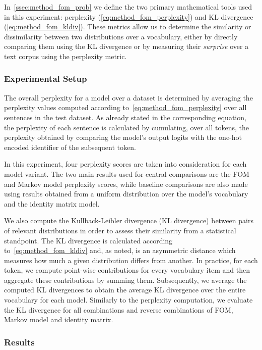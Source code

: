 In~\cref{ssec:method_fom_prob} we define the two primary mathematical tools used in this experiment: perplexity (\cref{eq:method_fom_perplexity}) and KL divergence (\cref{eq:method_fom_kldiv}).
These metrics allow us to determine the similarity or dissimilarity between two distributions over a vocabulary, either by directly comparing them using the KL divergence or by measuring their \emph{surprise} over a text corpus using the perplexity metric.

\subsubsection{Experimental Setup}

The overall perplexity for a model over a dataset is determined by averaging the perplexity values computed according to~\cref{eq:method_fom_perplexity} over all sentences in the test dataset.
As already stated in the corresponding equation, the perplexity of each sentence is calculated by cumulating, over all tokens, the perplexity obtained by comparing the model's output logits with the one-hot encoded identifier of the subsequent token.

In this experiment, four perplexity scores are taken into consideration for each model variant.
The two main results used for central comparisons are the FOM and Markov model perplexity scores, while baseline comparisons are also made using results obtained from a uniform distribution over the model's vocabulary and the identity matrix model.

We also compute the Kullback-Leibler divergence (KL divergence) between pairs of relevant distributions in order to assess their similarity from a statistical standpoint.
The KL divergence is calculated according to~\cref{eq:method_fom_kldiv} and, as noted, is an asymmetric distance which measures how much a given distribution differs from another.
In practice, for each token, we compute point-wise contributions for every vocabulary item and then aggregate these contributions by summing them.
Subsequently, we average the computed KL divergences to obtain the average KL divergence over the entire vocabulary for each model.
Similarly to the perplexity computation, we evaluate the KL divergence for all combinations and reverse combinations of FOM, Markov model and identity matrix.

\subsubsection{Results}

